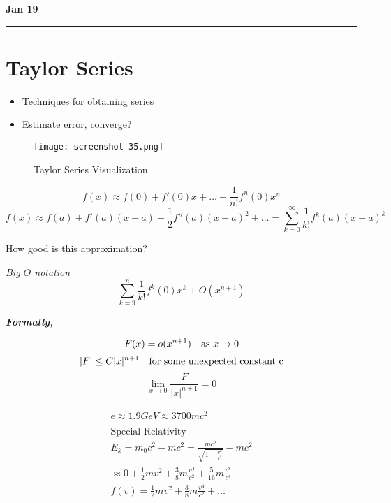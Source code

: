 \documentclass[svgnames]{article}   	%
\begin{document}
\newpage
\noindent \textbf{Jan 19} \hrule
\section{Taylor Series} 

\begin{itemize}
  \item Techniques for obtaining series
  \item Estimate error, converge?     
\end{itemize}

\begin{figure}[htb!]
  \centering
    \texttt{[image: screenshot 35.png]}
    \caption{Taylor Series Visualization}
\end{figure}


\vspace{5px} \[
  f(x) \approx f(0) + f'(0)x + \dots + \frac{1}{n!}f^{n}(0)x^n
\] \vspace{5px} 
\[
  f(x) \approx f(a) + f'(a)(x-a) + \frac{1}{2}f''(a)(x-a)^2 + ... = \sum_{k=0}^{\infty} \frac{1}{k!}f^{k} (a)
  (x-a)^k
\]

\begin{tcolorbox}[colback = red!5!white, colframe = red!50!black, title
  = Question]
  
  How good is this approximation? 

\end{tcolorbox}

\textit{ Big $O$ notation}
\vspace{5px} \[
\sum_{k=9}^{n} \frac{1}{k!}f^k(0) x^k + O(x^{n+1})
\] \vspace{5px}

\textit{ \textbf{Formally,}}

\vspace{5px} \[
  F(x) = o(x^{n+1}) \hspace{10px} \text{as } x \rightarrow 0
\] \vspace{5px}
\[
  |F| \leq C|x|^{n+1} \hspace{10px} \text{for some unexpected constant c}
\] \vspace{5px}
\[
  \lim_{x\to 0} \frac{F}{|x|^{n+1}} = 0
\] \vspace{5px}
\begin{tcolorbox}[colback = blue!5!white, colframe = blue!50!black, title
  = Example]
  \begin{gather*}
  e \approx 1.9 GeV \approx 3700 mc^2 \\\\
  \text{Special Relativity} \\
  E_k = m_0 c^2 - mc^2 = \frac{mc^2}{ \sqrt{ 1 - \frac{v^2}{c^2}}} - mc^2 \\
  \approx 0 + \frac{1}{2}mv^2 + \frac{3}{8}m\frac{v^4}{c^2} + \frac{5}{16}m
  \frac{v^8}{c^4} \\
  f(v) = \frac{1}{2}mv^2  + \frac{3}{8}m\frac{v^4}{c^2} + \dots 
  \end{gather*}
\end{tcolorbox}
\end{document}
